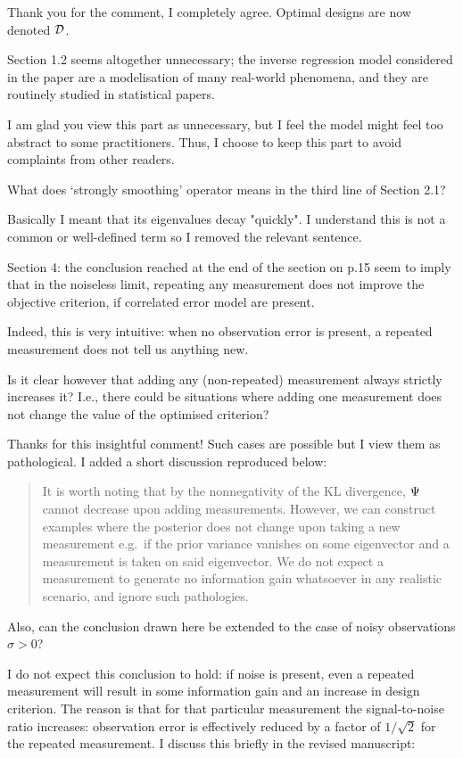 \AR Thank you for the comment, I completely agree. Optimal designs are
now denoted $\mathcal{D}$.

  
\RC Section 1.2 seems altogether unnecessary; the inverse regression
model considered in the paper are a modelisation of many real-world
phenomena, and they are routinely studied in statistical papers.

\AR I am glad you view this part as unnecessary, but I feel the model
might feel too abstract to some practitioners. Thus, I choose to keep
this part to avoid complaints from other readers.

\RC What does ‘strongly smoothing’ operator means in the third line of Section 2.1?

\AR Basically I meant that its eigenvalues decay "quickly". I
understand this is not a common or well-defined term so I removed the
relevant sentence.

  
\RC Section 4: the conclusion reached at the end of the section on
p.15 seem to imply that in the noiseless limit, repeating any
measurement does not improve the objective criterion, if correlated
error model are present.

\AR Indeed, this is very intuitive: when no observation error is
present, a repeated measurement does not tell us anything new.


\RC Is it clear however that adding any (non-repeated) measurement
always strictly increases it? I.e., there could be situations where
adding one measurement does not change the value of the optimised
criterion?

\AR Thanks for this insightful comment! Such cases are possible but I
view them as pathological. I added a short discussion reproduced
below:

\begin{quote}%
It is worth noting that by the nonnegativity of the KL divergence,
$\Psi$ cannot decrease upon adding measurements. However, we can
construct examples where the posterior does not change upon taking a
new measurement e.g.~if the prior variance vanishes on some
eigenvector and a measurement is taken on said eigenvector. We do not
expect a measurement to generate no information gain whatsoever in any
realistic scenario, and ignore such pathologies.
\end{quote}

\RC Also, can the conclusion drawn here be extended to the case of
noisy observations $\sigma > 0$?

\AR I do not expect this conclusion to hold: if noise is present, even
a repeated measurement will result in some information gain and an
increase in design criterion. The reason is that for that particular
measurement the signal-to-noise ratio increases: observation error is
effectively reduced by a factor of $1/\sqrt{2}$ for the repeated
measurement. I discuss this briefly in the revised manuscript:
 
